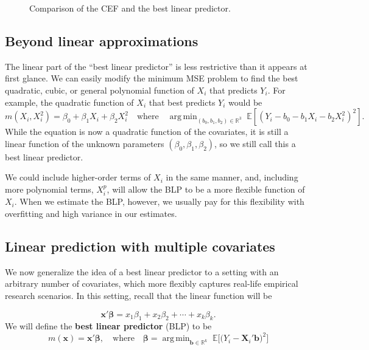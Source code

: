 \documentclass[
  13pt,
  letterpaper,
  DIV=11,
  numbers=noendperiod]{scrreprt}
\newcommand{\mb}{\symbf}
\newcommand{\E}{\mathbb{E}}
\newcommand{\real}{\mathbb{R}}
\newcommand{\bfx}{\mb{x}}
\newcommand{\bfbeta}{\mb{\beta}}
\DeclareMathOperator*{\argmin}{arg\,min}
\theoremstyle{definition}
\theoremstyle{definition}
\theoremstyle{plain}
\theoremstyle{remark}
\begin{document}
\begin{figure}[th]


\caption{\label{fig-cef-blp}Comparison of the CEF and the best linear
predictor.}

\end{figure}%

\subsection{Beyond linear
approximations}\label{beyond-linear-approximations}

The linear part of the ``best linear predictor'' is less restrictive
than it appears at first glance. We can easily modify the minimum MSE
problem to find the best quadratic, cubic, or general polynomial
function of \(X_i\) that predicts \(Y_i\). For example, the quadratic
function of \(X_i\) that best predicts \(Y_i\) would be \[ 
m(X_i, X_i^2) = \beta_0 + \beta_1X_i + \beta_2X_i^2 \quad\text{where}\quad \argmin_{(b_0,b_1,b_2) \in \mathbb{R}^3}\;\E[(Y_{i} - b_{0} - b_{1}X_{i} - b_{2}X_{i}^{2})^{2}].
\] While the equation is now a quadratic function of the covariates, it
is still a linear function of the unknown parameters
\((\beta_{0}, \beta_{1}, \beta_{2})\), so we still call this a best
linear predictor.

We could include higher-order terms of \(X_i\) in the same manner, and,
including more polynomial terms, \(X_i^p\), will allow the BLP to be a
more flexible function of \(X_i\). When we estimate the BLP, however, we
usually pay for this flexibility with overfitting and high variance in
our estimates.

\subsection{Linear prediction with multiple
covariates}\label{linear-prediction-with-multiple-covariates}

We now generalize the idea of a best linear predictor to a setting with
an arbitrary number of covariates, which more flexibly captures
real-life empirical research scenarios. In this setting, recall that the
linear function will be

\[ 
\bfx'\bfbeta = x_{1}\beta_{1} + x_{2}\beta_{2} + \cdots + x_{k}\beta_{k}.
\] We will define the \textbf{best linear predictor} (BLP) to be \[ 
m(\bfx) = \bfx'\bfbeta, \quad \text{where}\quad \bfbeta = \argmin_{\mb{b} \in \real^k}\; \E\bigl[ \bigl(Y_{i} - \mb{X}_{i}'\mb{b} \bigr)^2\bigr]
\]
\end{document}
